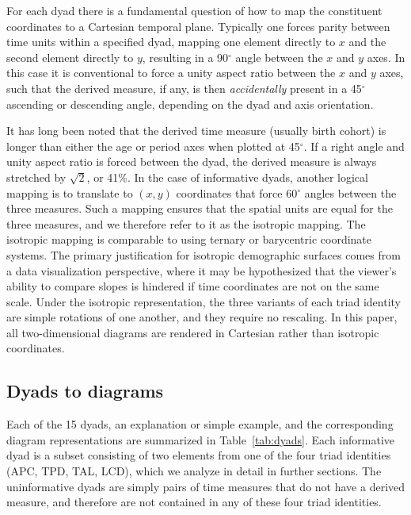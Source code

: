 \documentclass[12pt,oneside,a4paper]{article} %
\theoremstyle{definition}
\begin{document}
For each dyad there is a fundamental question of how to map the constituent
coordinates to a Cartesian temporal plane. Typically one forces parity between time units within
a specified dyad, mapping one element directly to $x$ and the second element
directly to $y$, resulting in a 90$^\circ$ angle between the $x$ and $y$
axes. In this case it is conventional to force a unity aspect ratio
between the $x$ and $y$ axes, such that the derived measure, if any, is then
\textit{accidentally} present in a 45$^\circ$ ascending or descending angle,
depending on the dyad and axis orientation. 

It has long been noted \citep{lexis1875einleitung, perozzo1880della} that the
derived time measure (usually birth cohort) is longer than either the age or period axes when plotted at 45$^\circ$.
If a right angle and unity aspect ratio is forced between the dyad, the derived measure is always stretched by
$\sqrt{2}$, or 41\%. In the case of informative dyads, another
logical mapping is to translate to $(x,y)$ coordinates that force 60$^\circ$
angles between the three measures. Such a mapping ensures that the spatial units are equal for the three measures, and we therefore refer to it as the isotropic mapping. The isotropic mapping
is comparable to using ternary or barycentric coordinate systems. 
The primary justification for isotropic demographic surfaces comes from
a data visualization perspective, where it may be hypothesized that the
 viewer's ability to compare slopes is hindered if time coordinates are not on
 the same scale. Under the isotropic representation, the three variants of each
 triad identity are simple rotations of one another, and they require no
 rescaling. In this paper, all two-dimensional diagrams are rendered in
 Cartesian rather than isotropic coordinates.

\subsection{Dyads to diagrams}
Each of the 15 dyads, an explanation or simple example,
and the corresponding diagram representations are summarized in
Table~\ref{tab:dyads}. Each informative dyad is a subset consisting of two
elements from one of the four triad identities (APC, TPD, TAL, LCD), which we
analyze in detail in further sections. The uninformative dyads are simply pairs
of time measures that do not have a derived measure, and therefore are not
contained in any of these four triad identities.
\pagebreak
\end{document}
